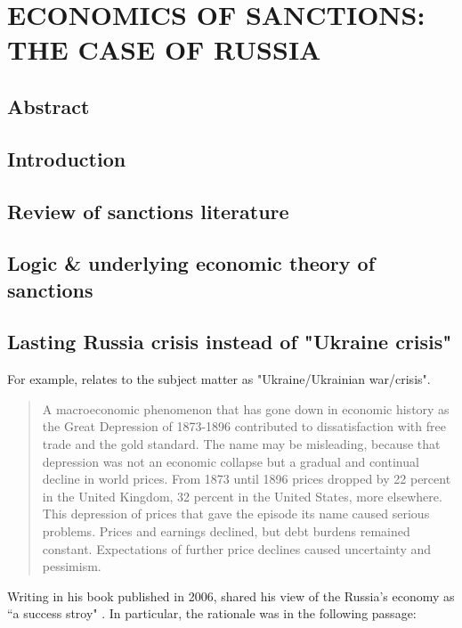 \newpage

\section{\MakeUppercase{Economics of Sanctions: The Case of Russia}}

\subsection*{Abstract}
\subsection{Introduction}
\subsection{Review of sanctions literature}
\subsection{Logic \& underlying economic theory of sanctions}

\subsection{Lasting Russia crisis instead of "Ukraine crisis"}

For example, \citep{prates2023} relates to the subject matter as "Ukraine/Ukrainian war/crisis".

\begin{quote}
A macroeconomic phenomenon that has gone down in economic history as the Great Depression of 1873-1896 contributed to dissatisfaction with free trade and the gold standard. The name may be misleading, because that depression was not an economic collapse but a gradual and continual decline in world prices. From 1873 until 1896 prices dropped by 22 percent in the United Kingdom, 32 percent in the United States, more elsewhere. This depression of prices that gave the episode its name caused serious problems. Prices and earnings declined, but debt burdens remained constant. Expectations of further price declines caused uncertainty and pessimism. \citep[p.~8]{freiden2006}
\end{quote}

Writing in his book published in 2006, \citeauthor{gardiner2006} shared his view of the Russia's economy as ``a success stroy" \citeyearpar[p.~233]{gardiner2006}. In particular, the rationale was in the following passage:

